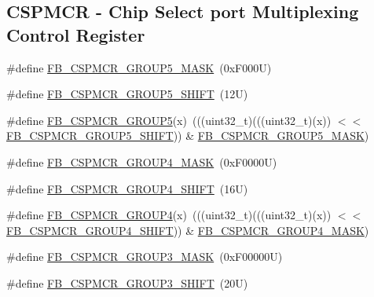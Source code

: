 \subsection*{C\+S\+P\+M\+CR -\/ Chip Select port Multiplexing Control Register}
\begin{DoxyCompactItemize}
\item 
\#define \mbox{\hyperlink{group___f_b___register___masks_ga2c198cc055fa5fd82f9f9441613af96d}{F\+B\+\_\+\+C\+S\+P\+M\+C\+R\+\_\+\+G\+R\+O\+U\+P5\+\_\+\+M\+A\+SK}}~(0x\+F000\+U)
\item 
\#define \mbox{\hyperlink{group___f_b___register___masks_gaa406022bcdd78d1d96d379efcf539ca7}{F\+B\+\_\+\+C\+S\+P\+M\+C\+R\+\_\+\+G\+R\+O\+U\+P5\+\_\+\+S\+H\+I\+FT}}~(12\+U)
\item 
\#define \mbox{\hyperlink{group___f_b___register___masks_ga61aeb8bb9251b57140fde249ce7670fa}{F\+B\+\_\+\+C\+S\+P\+M\+C\+R\+\_\+\+G\+R\+O\+U\+P5}}(x)~(((uint32\+\_\+t)(((uint32\+\_\+t)(x)) $<$$<$ \mbox{\hyperlink{group___f_b___register___masks_gaa406022bcdd78d1d96d379efcf539ca7}{F\+B\+\_\+\+C\+S\+P\+M\+C\+R\+\_\+\+G\+R\+O\+U\+P5\+\_\+\+S\+H\+I\+FT}})) \& \mbox{\hyperlink{group___f_b___register___masks_ga2c198cc055fa5fd82f9f9441613af96d}{F\+B\+\_\+\+C\+S\+P\+M\+C\+R\+\_\+\+G\+R\+O\+U\+P5\+\_\+\+M\+A\+SK}})
\item 
\#define \mbox{\hyperlink{group___f_b___register___masks_gaa24d34ff345a0131f93f71c38e20b7a5}{F\+B\+\_\+\+C\+S\+P\+M\+C\+R\+\_\+\+G\+R\+O\+U\+P4\+\_\+\+M\+A\+SK}}~(0x\+F0000\+U)
\item 
\#define \mbox{\hyperlink{group___f_b___register___masks_ga53fde1abc71ae9149418ea7fb6e53fba}{F\+B\+\_\+\+C\+S\+P\+M\+C\+R\+\_\+\+G\+R\+O\+U\+P4\+\_\+\+S\+H\+I\+FT}}~(16\+U)
\item 
\#define \mbox{\hyperlink{group___f_b___register___masks_ga5bc5cb1164507be89f7cf0324491d5f1}{F\+B\+\_\+\+C\+S\+P\+M\+C\+R\+\_\+\+G\+R\+O\+U\+P4}}(x)~(((uint32\+\_\+t)(((uint32\+\_\+t)(x)) $<$$<$ \mbox{\hyperlink{group___f_b___register___masks_ga53fde1abc71ae9149418ea7fb6e53fba}{F\+B\+\_\+\+C\+S\+P\+M\+C\+R\+\_\+\+G\+R\+O\+U\+P4\+\_\+\+S\+H\+I\+FT}})) \& \mbox{\hyperlink{group___f_b___register___masks_gaa24d34ff345a0131f93f71c38e20b7a5}{F\+B\+\_\+\+C\+S\+P\+M\+C\+R\+\_\+\+G\+R\+O\+U\+P4\+\_\+\+M\+A\+SK}})
\item 
\#define \mbox{\hyperlink{group___f_b___register___masks_gac53d0fcbc3464725ceda1d20147fe98c}{F\+B\+\_\+\+C\+S\+P\+M\+C\+R\+\_\+\+G\+R\+O\+U\+P3\+\_\+\+M\+A\+SK}}~(0x\+F00000\+U)
\item 
\#define \mbox{\hyperlink{group___f_b___register___masks_ga9f0b849b6cb1a2f629dcd23a0a0a4306}{F\+B\+\_\+\+C\+S\+P\+M\+C\+R\+\_\+\+G\+R\+O\+U\+P3\+\_\+\+S\+H\+I\+FT}}~(20\+U)

\end{DoxyCompactItemize}
